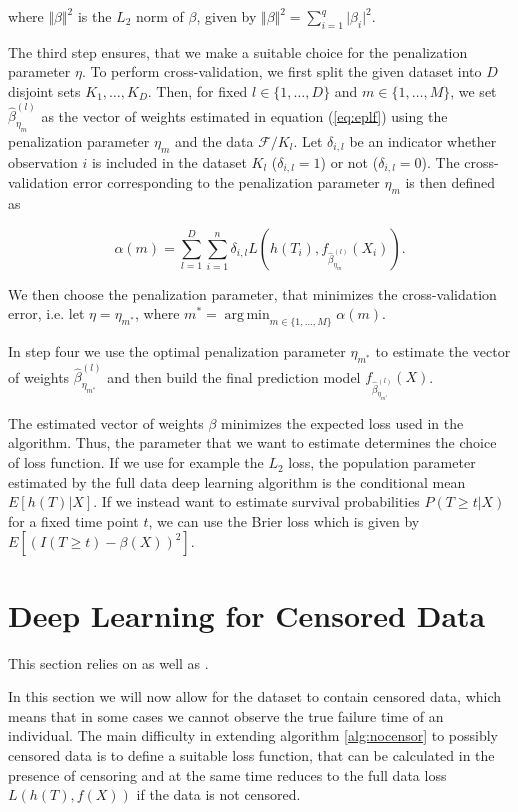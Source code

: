 \documentclass[12pt, a4paper]{article}
\theoremstyle{definition}
\theoremstyle{plain}
\numberwithin{equation}{section}
\numberwithin{figure}{section}
\numberwithin{table}{section}
\DeclareMathOperator*{\argmin}{arg\,min}
\begin{document}
	where $\Vert \beta \Vert ^2$ is the $L_2$ norm of $\beta$, given by $\Vert \beta \Vert ^2 = \sum_{i=1}^q \vert \beta _i \vert ^2.$
	
	The third step ensures, that we make a suitable choice for the penalization parameter $\eta$.
	To perform cross-validation, we first split the given dataset into $D$ disjoint sets $K_1,\dots, K_D$.
	Then, for fixed $l \in \{1,\dots,D\}$ and $m \in \{1,\dots,M\}$, we set $\hat{\beta}_{\eta_{m}}^{(l)}$ as the vector of weights estimated in equation (\ref{eq:eplf}) using the penalization parameter $\eta_m$ and the data $\mathcal{F} / K_l$.
	Let $\delta_{i,l}$ be an indicator whether observation $i$ is included in the dataset $K_l$ ($\delta_{i,l} = 1$) or not ($\delta_{i,l}=0$).
	The cross-validation error corresponding to the penalization parameter $\eta_m$ is then defined as
	
	\begin{equation*}
	 \alpha(m) = \sum_{l=1}^D \sum_{i=1}^n \delta_{i,l} L(h(T_i), f_{\hat{\beta}_{\eta_m}^{(l)}}(X_i)).
 	\end{equation*}
 	
 	We then choose the penalization parameter, that minimizes the cross-validation error, i.e. let $\eta = \eta_{m^*}$, where $m^* = \argmin_{m \in \{1,\dots,M\}} \alpha(m)$.
 	
 	In step four we use the optimal penalization parameter $\eta_{m^*}$ to estimate the vector of weights $\hat{\beta}_{\eta_{m^*}}^{(l)}$ and then build the final prediction model $f_{\hat{\beta}_{\eta_{m^*}}^{(l)}}(X)$.
 	
 	The estimated vector of weights $\beta$ minimizes the expected loss used in the algorithm.
 	Thus, the parameter that we want to estimate determines the choice of loss function.
 	If we use for example the $L_2$ loss, the population parameter estimated by the full data deep learning algorithm is the conditional mean $E[h(T) \vert X]$.
 	If we instead want to estimate survival probabilities $P(T\geq t \vert X )$ for a fixed time point $t$, we can use the Brier loss which is given by $E[(I(T\geq t)-\beta(X))^2]$.
 	
	\newpage
	\section{Deep Learning for Censored Data} \label{censored}
	
	This section relies on \citet*{basearticle} as well as \citet*{deeplbook}.
	
	In this section we will now allow for the dataset to contain censored data, which means that in some cases we cannot observe the true failure time of an individual.
	The main difficulty in extending algorithm \ref{alg:nocensor} to possibly censored data is to define a suitable loss function, that can be calculated in the presence of censoring and at the same time reduces to the full data loss $L(h(T), f(X))$ if the data is not censored.
	
\end{document}
